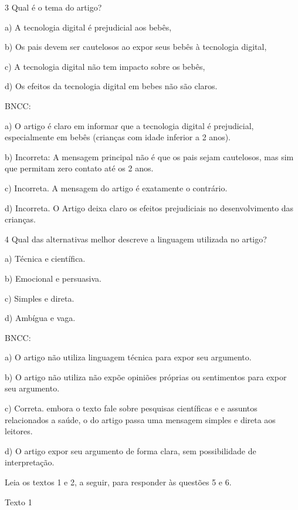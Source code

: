 \num{3} Qual é o tema do artigo?

a) A tecnologia digital é prejudicial aos bebês,

b) Os pais devem ser cautelosos ao expor seus bebês à tecnologia
digital,

c) A tecnologia digital não tem impacto sobre os bebês,

d) Os efeitos da tecnologia digital em bebes não são claros.

BNCC:

a) O artigo é claro em informar que a tecnologia digital é prejudicial,
especialmente em bebês (crianças com idade inferior a 2 anos).

b) Incorreta: A mensagem principal não é que os pais sejam cautelosos,
mas sim que permitam zero contato até os 2 anos.

c) Incorreta. A mensagem do artigo é exatamente o contrário.

d) Incorreta. O Artigo deixa claro os efeitos prejudiciais no
desenvolvimento das crianças.

\num{4} Qual das alternativas melhor descreve a linguagem utilizada no
artigo?

a) Técnica e científica.

b) Emocional e persuasiva.

c) Simples e direta.

d) Ambígua e vaga.

BNCC:

a) O artigo não utiliza linguagem técnica para expor seu argumento.

b) O artigo não utiliza não expõe opiniões próprias ou sentimentos para
expor seu argumento.

c) Correta. embora o texto fale sobre pesquisas científicas e e assuntos
relacionados a saúde, o do artigo passa uma mensagem simples e direta
aos leitores.

d) O artigo expor seu argumento de forma clara, sem possibilidade de
interpretação.

Leia os textos 1 e 2, a seguir, para responder às questões 5 e 6.

Texto 1

